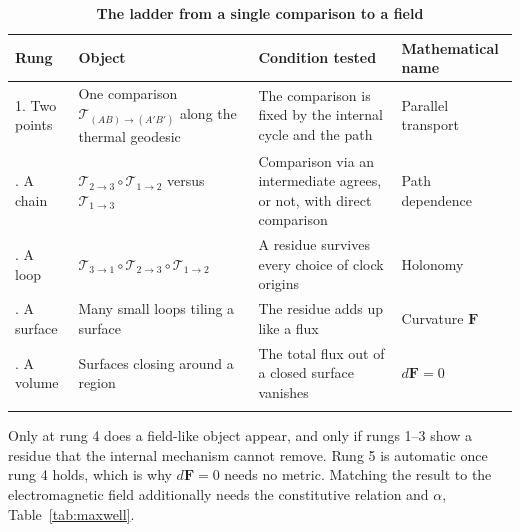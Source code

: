 \documentclass[%
 reprint, amsmath,amssymb, aps, prb, ]{revtex4-2}
\numberwithin{equation}{section}
\newcommand{\FF}{\mathbf{F}}
\begin{document}
\begin{table}[t!]
\centering
\caption{\textbf{The ladder from a single comparison to a field}}
\label{tab:ladder}
\renewcommand{\arraystretch}{1.4}
\begin{tabular}{p{2.6cm}p{5.0cm}p{4.2cm}p{3.6cm}}
\toprule
\textbf{Rung} & \textbf{Object} & \textbf{Condition tested} & \textbf{Mathematical name} \\
\midrule
1. Two points
& One comparison $\mathcal{T}_{(AB)\to(A'B')}$ along the thermal geodesic
& The comparison is fixed by the internal cycle and the path
& Parallel transport \\
\addlinespace[0.3cm]
2. A chain
& $\mathcal{T}_{2\to3}\circ\mathcal{T}_{1\to2}$ versus $\mathcal{T}_{1\to3}$
& Comparison via an intermediate agrees, or not, with direct comparison
& Path dependence \\
\addlinespace[0.3cm]
3. A loop
& $\mathcal{T}_{3\to1}\circ\mathcal{T}_{2\to3}\circ\mathcal{T}_{1\to2}$
& A residue survives every choice of clock origins
& Holonomy \\
\addlinespace[0.3cm]
4. A surface
& Many small loops tiling a surface
& The residue adds up like a flux
& Curvature $\FF$ \\
\addlinespace[0.3cm]
5. A volume
& Surfaces closing around a region
& The total flux out of a closed surface vanishes
& $d\FF=0$ \\
\addlinespace[0.2cm]
\bottomrule
\end{tabular}
\vspace{0.2cm}
\begin{minipage}{0.95\textwidth}
\justifying\footnotesize
Only at rung 4 does a field-like object appear, and only if rungs 1--3 show a residue that the internal mechanism cannot remove. Rung 5 is automatic once rung 4 holds, which is why $d\FF=0$ needs no metric. Matching the result to the electromagnetic field additionally needs the constitutive relation and $\alpha$, Table~\ref{tab:maxwell}.
\end{minipage}
\end{table}
\end{document}

